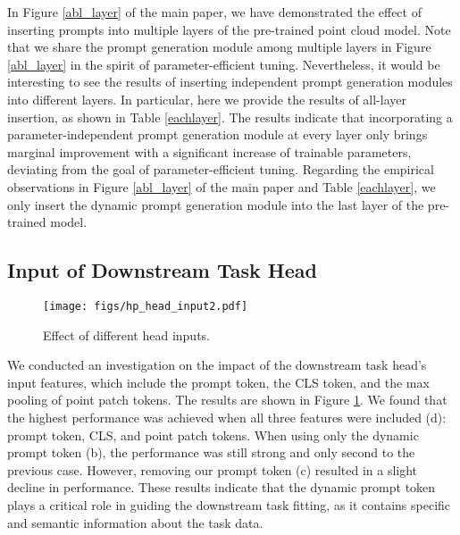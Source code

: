 \documentclass[10pt,twocolumn,letterpaper]{article}
\begin{document}
In Figure \ref{abl_layer} of the main paper, we have demonstrated the effect of inserting prompts into multiple layers of the pre-trained point cloud model. 
Note that we share the prompt generation module among multiple layers in Figure \ref{abl_layer} in the spirit of parameter-efficient tuning. 
Nevertheless, it would be interesting to see the results of inserting independent prompt generation modules into different layers. 
In particular, here we provide the results of all-layer insertion, as shown in Table \ref{eachlayer}. 
The results indicate that incorporating a parameter-independent prompt generation module at every layer only brings marginal improvement with a significant increase of trainable parameters, deviating from the goal of parameter-efficient tuning. 
Regarding the empirical observations in Figure \ref{abl_layer} of the main paper and Table \ref{eachlayer}, we only insert the dynamic prompt generation module into the last layer of the pre-trained model.

\begin{table}[h]
  \centering
  \caption{Effect of inserting independent prompt modules to all layers. PM indicates the dynamic prompt generation module.}
  \label{eachlayer}\end{table}

\subsection{Input of Downstream Task Head} 
\begin{figure}[h]
\centering
\texttt{[image: figs/hp\_head\_input2.pdf]} 
\caption{Effect of different head inputs.}
\label{abl_head}
\end{figure}

We conducted an investigation on the impact of the downstream task head's input features, which include the prompt token, the CLS token, and the max pooling of point patch tokens. The results are shown in Figure \ref{abl_head}. We found that the highest performance was achieved when all three features were included (d): prompt token, CLS, and point patch tokens. When using only the dynamic prompt token (b), the performance was still strong and only second to the previous case. However, removing our prompt token (c) resulted in a slight decline in performance. These results indicate that the dynamic prompt token plays a critical role in guiding the downstream task fitting, as it contains specific and semantic information about the task data.
\end{document}
